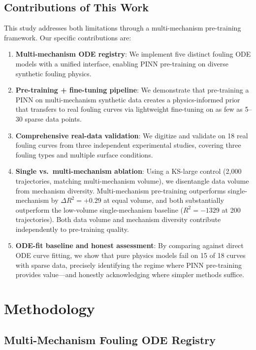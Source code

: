 \documentclass[review]{elsarticle}
\begin{document}
\subsection{Contributions of This Work}

This study addresses both limitations through a multi-mechanism pre-training framework. Our specific contributions are:

\begin{enumerate}
\item \textbf{Multi-mechanism ODE registry}: We implement five distinct fouling ODE models with a unified interface, enabling PINN pre-training on diverse synthetic fouling physics.
\item \textbf{Pre-training + fine-tuning pipeline}: We demonstrate that pre-training a PINN on multi-mechanism synthetic data creates a physics-informed prior that transfers to real fouling curves via lightweight fine-tuning on as few as 5--30 sparse data points.
\item \textbf{Comprehensive real-data validation}: We digitize and validate on 18 real fouling curves from three independent experimental studies, covering three fouling types and multiple surface conditions.
\item \textbf{Single vs.\ multi-mechanism ablation}: Using a KS-large control (2,000 trajectories, matching multi-mechanism volume), we disentangle data volume from mechanism diversity. Multi-mechanism pre-training outperforms single-mechanism by $\Delta R^2 = +0.29$ at equal volume, and both substantially outperform the low-volume single-mechanism baseline ($R^2 = -1329$ at 200 trajectories). Both data volume and mechanism diversity contribute independently to pre-training quality.
\item \textbf{ODE-fit baseline and honest assessment}: By comparing against direct ODE curve fitting, we show that pure physics models fail on 15 of 18 curves with sparse data, precisely identifying the regime where PINN pre-training provides value---and honestly acknowledging where simpler methods suffice.
\end{enumerate}

\section{Methodology}

\subsection{Multi-Mechanism Fouling ODE Registry}
\end{document}
